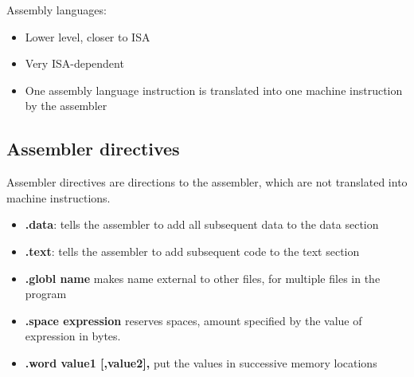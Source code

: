 \documentclass[11pt,a4paper]{article}
\begin{document}
Assembly languages:
\begin{itemize}
    \item Lower level, closer to ISA
    \item Very ISA-dependent
    \item One assembly language instruction is translated into one machine instruction by the assembler
\end{itemize}
\subsection{Assembler directives}
Assembler directives are directions to the assembler, which are not translated into machine instructions. \par
\begin{itemize}
    \item \textbf{.data}: tells the assembler to add all subsequent data to the data section
    \item \textbf{.text}: tells the assembler to add subsequent code to the text section
    \item \textbf{.globl name} makes name external to other files, for multiple files in the program
    \item \textbf{.space expression} reserves spaces, amount specified by the value of expression in bytes.
    \item \textbf{.word value1 [,value2],} put the values in successive memory locations
\end{itemize}
\end{document}
